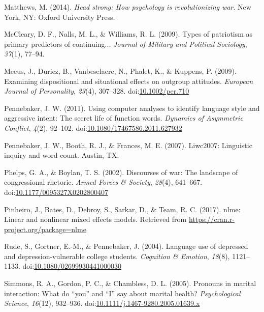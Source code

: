 \documentclass[english,man]{apa6}
\theoremstyle{definition}
\theoremstyle{definition}
\theoremstyle{definition}
\theoremstyle{remark}
\begin{document}
\hypertarget{ref-Matthews2014}{}
Matthews, M. (2014). \emph{Head strong: How psychology is
revolutionizing war}. New York, NY: Oxford University Press.

\hypertarget{ref-McCleary2009}{}
McCleary, D. F., Nalls, M. L., \& Williams, R. L. (2009). Types of
patriotism as primary predictors of continuing... \emph{Journal of
Military and Political Sociology}, \emph{37}(1), 77--94.

\hypertarget{ref-Meeus2009}{}
Meeus, J., Duriez, B., Vanbeselaere, N., Phalet, K., \& Kuppens, P.
(2009). Examining dispositional and situational effects on outgroup
attitudes. \emph{European Journal of Personality}, \emph{23}(4),
307--328. doi:\href{https://doi.org/10.1002/per.710}{10.1002/per.710}

\hypertarget{ref-Pennebaker2011}{}
Pennebaker, J. W. (2011). Using computer analyses to identify language
style and aggressive intent: The secret life of function words.
\emph{Dynamics of Asymmetric Conflict}, \emph{4}(2), 92--102.
doi:\href{https://doi.org/10.1080/17467586.2011.627932}{10.1080/17467586.2011.627932}

\hypertarget{ref-Pennebaker2007}{}
Pennebaker, J. W., Booth, R. J., \& Frances, M. E. (2007). Liwc2007:
Linguistic inquiry and word count. Austin, TX.

\hypertarget{ref-Phelps2002}{}
Phelps, G. A., \& Boylan, T. S. (2002). Discourses of war: The landscape
of congressional rhetoric. \emph{Armed Forces \& Society}, \emph{28}(4),
641--667.
doi:\href{https://doi.org/10.1177/0095327X0202800407}{10.1177/0095327X0202800407}

\hypertarget{ref-Pinheiro2017}{}
Pinheiro, J., Bates, D., Debroy, S., Sarkar, D., \& Team, R. C. (2017).
nlme: Linear and nonlinear mixed effects models. Retrieved from
\url{https://cran.r-project.org/package=nlme}

\hypertarget{ref-Rude2004}{}
Rude, S., Gortner, E.-M., \& Pennebaker, J. (2004). Language use of
depressed and depression-vulnerable college students. \emph{Cognition \&
Emotion}, \emph{18}(8), 1121--1133.
doi:\href{https://doi.org/10.1080/02699930441000030}{10.1080/02699930441000030}

\hypertarget{ref-Simmons2005}{}
Simmons, R. A., Gordon, P. C., \& Chambless, D. L. (2005). Pronouns in
marital interaction: What do ``you'' and ``I'' say about marital health?
\emph{Psychological Science}, \emph{16}(12), 932--936.
doi:\href{https://doi.org/10.1111/j.1467-9280.2005.01639.x}{10.1111/j.1467-9280.2005.01639.x}
\end{document}
